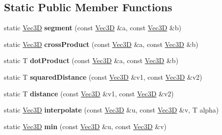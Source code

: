 \subsection*{Static Public Member Functions}
\begin{DoxyCompactItemize}
\item 
\hypertarget{class_vec3_d_abc93ae5f29e66aee988f065d7c311ee5}{
static \hyperlink{class_vec3_d}{Vec3D} {\bfseries segment} (const \hyperlink{class_vec3_d}{Vec3D} \&a, const \hyperlink{class_vec3_d}{Vec3D} \&b)}
\label{class_vec3_d_abc93ae5f29e66aee988f065d7c311ee5}

\item 
\hypertarget{class_vec3_d_a808067187daf7e7f875c93a16c0dc526}{
static \hyperlink{class_vec3_d}{Vec3D} {\bfseries crossProduct} (const \hyperlink{class_vec3_d}{Vec3D} \&a, const \hyperlink{class_vec3_d}{Vec3D} \&b)}
\label{class_vec3_d_a808067187daf7e7f875c93a16c0dc526}

\item 
\hypertarget{class_vec3_d_a0b5bcd8c4751c8eab79b83f960e732cb}{
static T {\bfseries dotProduct} (const \hyperlink{class_vec3_d}{Vec3D} \&a, const \hyperlink{class_vec3_d}{Vec3D} \&b)}
\label{class_vec3_d_a0b5bcd8c4751c8eab79b83f960e732cb}

\item 
\hypertarget{class_vec3_d_a1393ee4d8854ffa980e5ab3c76647d56}{
static T {\bfseries squaredDistance} (const \hyperlink{class_vec3_d}{Vec3D} \&v1, const \hyperlink{class_vec3_d}{Vec3D} \&v2)}
\label{class_vec3_d_a1393ee4d8854ffa980e5ab3c76647d56}

\item 
\hypertarget{class_vec3_d_abab85e2faa41780ceb53b13c6d866d8f}{
static T {\bfseries distance} (const \hyperlink{class_vec3_d}{Vec3D} \&v1, const \hyperlink{class_vec3_d}{Vec3D} \&v2)}
\label{class_vec3_d_abab85e2faa41780ceb53b13c6d866d8f}

\item 
\hypertarget{class_vec3_d_a3acfa8bebd1fde147137d88c279bd68e}{
static \hyperlink{class_vec3_d}{Vec3D} {\bfseries interpolate} (const \hyperlink{class_vec3_d}{Vec3D} \&u, const \hyperlink{class_vec3_d}{Vec3D} \&v, T alpha)}
\label{class_vec3_d_a3acfa8bebd1fde147137d88c279bd68e}

\item 
\hypertarget{class_vec3_d_ad66b357170a809914269453c86d4246b}{
static \hyperlink{class_vec3_d}{Vec3D} {\bfseries min} (const \hyperlink{class_vec3_d}{Vec3D} \&u, const \hyperlink{class_vec3_d}{Vec3D} \&v)}
\label{class_vec3_d_ad66b357170a809914269453c86d4246b}


\end{DoxyCompactItemize}
